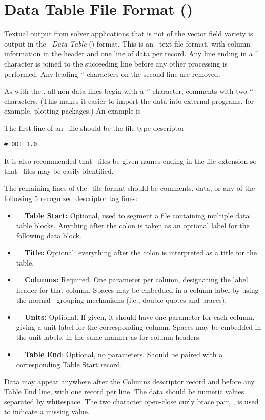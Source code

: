 \section{Data Table File Format (\ODT)}\label{sec:odtformat}
Textual output from solver applications that is not of the vector field
variety is output in the {\em \OOMMF\ Data Table} (\ODT)
format.  This is an \ASCII\ text file format,
with column information in the header and one line of data per record.
Any line ending in a '\bs' character is joined to the succeeding
line before any other processing is performed.  Any leading `\lb'
characters on the second line are removed.

As with the , all non-data lines begin with a `\lb'
character, comments with two `\lb' characters.  (This makes it easier
to import the data into external programs, for example, plotting
packages.)  An example is 

The first line of an \ODT\ file should be the file type descriptor
\begin{verbatim}
# ODT 1.0
\end{verbatim}
It is also recommended that \ODT\ files be given names ending
in the file extension  so that \ODT\ files may be
easily identified.

The remaining lines of the \ODT\ file format should be comments,
data, or any of the following 5 recognized descriptor tag lines:
\begin{itemize}
\item {\bf\ \lb\ Table Start:} Optional, used to segment a file
   containing multiple data table blocks.  Anything after the colon is
   taken as an optional label for the following data block.
\item {\bf\ \lb\ Title:} Optional; everything after the colon is
   interpreted as a title for the table.
\item {\bf\ \lb\ Columns:} Required.  One parameter per column,
   designating the label header for that column.  Spaces may be embedded
   in a column label by using the normal \Tcl\ grouping mechanisms
   (i.e., double-quotes and braces).
\item {\bf\ \lb\ Units:} Optional.  If given, it should have one
   parameter for each column, giving a unit label for the
   corresponding column.  Spaces may be embedded in the unit labels, in
   the same manner as for column headers.
\item {\bf\ \lb\ Table End}: Optional, no parameters.  Should be paired
   with a corresponding Table Start record.
\end{itemize}
Data may appear anywhere after the Columns descriptor record
and before any Table End line, with one record per line.
The data should be numeric values separated by whitespace.  The two
character open-close curly brace pair, \ocb\ccb, is used to indicate
a missing value.

